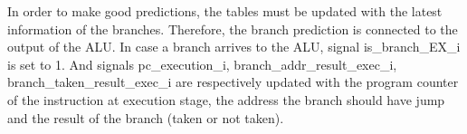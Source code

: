In order to make good predictions, the tables must be updated with the latest information of the branches. Therefore, the branch prediction is connected to the output of the ALU. In case a branch arrives to the ALU, signal is\_branch\_EX\_i is set to 1. And signals pc\_execution\_i, branch\_addr\_result\_exec\_i, branch\_taken\_result\_exec\_i are respectively updated with the program counter of the instruction at execution stage, the address the branch should have jump and the result of the branch (taken or not taken).

